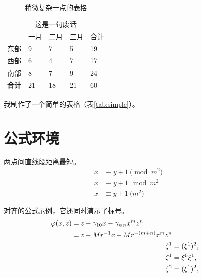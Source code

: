 \documentclass[
    doctor,
    pdflinks,
    ]{xjtuthesis}
\begin{document}
            \begin{table}[h!]
              \centering
              \caption{稍微复杂一点的表格}
              \label{tab:complex}
              \wuhao
              \begin{tabularx}{\linewidth}{XXXXX} \toprule 
                    & \multicolumn{3}{c}{这是一句废话} &  \\ \cmidrule{2-4}
                    & 一月 & 二月 & 三月 & 合计 \\ \midrule
               东部 &    9 &    7 &    5 &   19 \\ 
               西部 &    6 &    4 &    7 &   17 \\ 
               南部 &    8 &    7 &    9 &   24 \\ 
           \bf 合计 &   21 &   18 &   21 &   60 \\ \bottomrule
              \end{tabularx}
            \end{table}

            我制作了一个简单的表格（表\ref{tab:simple}）。


    \chapter{公式环境}

            \begin{axiom}
                \rm 两点间直线段距离最短。  
                \begin{align}
                    x&\equiv y+1\pmod{m^2}\\
                    x&\equiv y+1\mod{m^2}\\
                    x&\equiv y+1\pod{m^2}
                \end{align}
            \end{axiom}

            \begin{remark}
            \rm 对齐的公式示例，它还同时演示了标号。
            \begin{align}
            \begin{split} 
            \varphi(x,z)
            &=z-\gamma_{10}x-\gamma_{mn}x^mz^n\\
            &=z-Mr^{-1}x-Mr^{-(m+n)}x^mz^n
            \end{split} \notag \\
            \noindent\zeta^1&=(\xi^1)^2,\\
            \zeta^1 &=\xi^0\xi^1,\\
            \zeta^2 &=(\xi^1)^2,
            \end{align}
            \end{remark}
\end{document}

